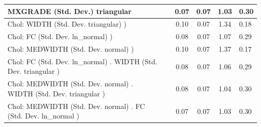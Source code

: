 \begin{table}
\begin{center}
\begin{tabular}{|l|l|c|c|c|l|}
			\hline
			MXGRADE (Std. Dev.) triangular &  & 0.07 & 0.07 & 1.03 & 0.30 \\
			\hline
			 Chol: WIDTH (Std. Dev. triangular) ) &  & 0.10 & 0.07 & 1.34 & 0.18 \\
			\hline
			 Chol: FC (Std. Dev. ln_normal) ) &  & 0.08 & 0.07 & 1.07 & 0.29 \\
			\hline
			 Chol: MEDWIDTH (Std. Dev. normal) ) &  & 0.10 & 0.07 & 1.37 & 0.17 \\
			\hline
			 Chol: FC (Std. Dev. ln_normal) . WIDTH (Std. Dev.   triangular ) &  & 0.08 & 0.07 & 1.06 & 0.29 \\
			\hline
			 Chol: MEDWIDTH (Std. Dev. normal) . WIDTH (Std. Dev.   triangular ) &  & 0.08 & 0.07 & 1.04 & 0.30 \\
			\hline
			 Chol: MEDWIDTH (Std. Dev. normal) . FC (Std. Dev.   ln_normal ) &  & 0.07 & 0.07 & 1.03 & 0.30 \\
			\hline
		\end{tabular}
	\end{center}
\end{table}